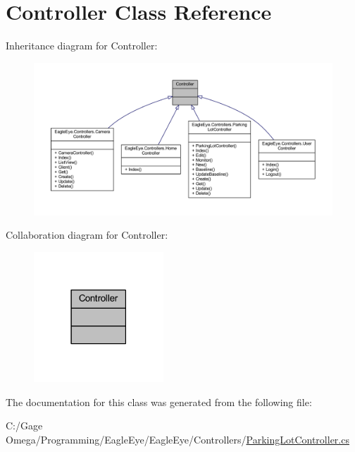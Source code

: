 \hypertarget{class_controller}{}\section{Controller Class Reference}
\label{class_controller}


Inheritance diagram for Controller\+:
\nopagebreak
\begin{figure}[H]
\begin{center}
\leavevmode
\includegraphics[width=350pt]{class_controller__inherit__graph}
\end{center}
\end{figure}


Collaboration diagram for Controller\+:
\nopagebreak
\begin{figure}[H]
\begin{center}
\leavevmode
\includegraphics[width=138pt]{class_controller__coll__graph}
\end{center}
\end{figure}


The documentation for this class was generated from the following file\+:\begin{DoxyCompactItemize}
\item 
C\+:/\+Gage Omega/\+Programming/\+Eagle\+Eye/\+Eagle\+Eye/\+Controllers/\mbox{\hyperlink{_parking_lot_controller_8cs}{Parking\+Lot\+Controller.\+cs}}\end{DoxyCompactItemize}
